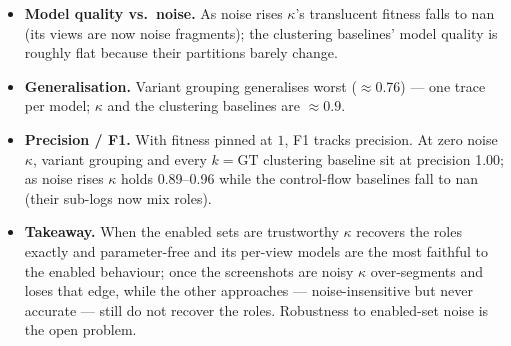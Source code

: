 \begin{itemize}
\item \textbf{Model quality vs.\ noise.} As noise rises $\kappa$'s translucent fitness falls to nan (its views are now noise fragments); the clustering baselines' model quality is roughly flat because their partitions barely change.
\item \textbf{Generalisation.} Variant grouping generalises worst ($\approx$0.76) --- one trace per model; $\kappa$ and the clustering baselines are $\approx0.9$.
\item \textbf{Precision / F1.} With fitness pinned at $1$, F1 tracks precision. At zero noise $\kappa$, variant grouping and every $k=\mathrm{GT}$ clustering baseline sit at precision 1.00; as noise rises $\kappa$ holds 0.89--0.96 while the control-flow baselines fall to nan (their sub-logs now mix roles).
\item \textbf{Takeaway.} When the enabled sets are trustworthy $\kappa$ recovers the roles exactly and parameter-free and its per-view models are the most faithful to the enabled behaviour; once the screenshots are noisy $\kappa$ over-segments and loses that edge, while the other approaches --- noise-insensitive but never accurate --- still do not recover the roles. Robustness to enabled-set noise is the open problem.
\end{itemize}
